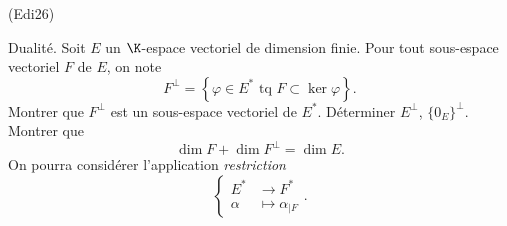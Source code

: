 \begin{tiny}(Edi26)\end{tiny} Dualité.\newline
Soit $E$ un $\K$-espace vectoriel de dimension finie. Pour tout sous-espace vectoriel $F$ de $E$, on note
\begin{displaymath}
 F^{\bot}=\left\lbrace \varphi \in E^* \text{ tq } F\subset \ker \varphi\right\rbrace .
\end{displaymath}
Montrer que $F^\bot$ est un sous-espace vectoriel de $E^*$. Déterminer $E^\bot$, $\{0_E\}^\bot$. Montrer que
\begin{displaymath}
 \dim F + \dim F^\bot = \dim E.
\end{displaymath}
On pourra considérer l'application \emph{restriction}
\begin{displaymath}
\left\lbrace 
\begin{aligned}
  E^* &\rightarrow F^* \\ \alpha &\mapsto \alpha_{|F}
\end{aligned}
\right. .
\end{displaymath}
